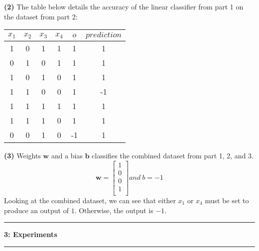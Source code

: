\documentclass[11pt]{article}
\newcommand\question[2]{\vspace{.25in}\hrule\textbf{#1: #2}\vspace{.5em}\hrule\vspace{.10in}}
\renewcommand\part[1]{\vspace{.10in}\textbf{(#1)}}
\begin{document}
\part{2} The table below details the accuracy of the linear classifier from part 1 on the dataset from part 2:
 \begin{center}
    \begin{tabular}{cccc|c|c}
      $x_1$ & $x_2$ & $x_3$ & $x_4$ & $o$ & $prediction$\\ \hline
      1 & 0 & 1 & 1 & 1 & 1\\
      0 & 1 & 0 & 1 & 1 & 1\\
      1 & 0 & 1 & 0 & 1 & 1\\
      1 & 1 & 0 & 0 & 1 & -1\\
      1 & 1 & 1 & 1 & 1 & 1\\
      1 & 1 & 1 & 0 & 1 & 1\\
      0 & 0 & 1 & 0 & -1 & 1\\
    \end{tabular}
  \end{center}

\part{3} Weights $\mathbf{w}$ and a bias $\mathbf{b}$ classifies the combined dataset from part 1, 2, and 3.
$$
\mathbf{w} = \begin{bmatrix}
1 \\
0 \\
0 \\
1 \\ 	
\end{bmatrix}
 and \ b = -1
$$
Looking at the combined dataset, we can see that either $x_1$ or $x_4$ must be set to produce an output of $1$. Otherwise, the output is $-1$.

\question{3}{Experiments}
\end{document}
